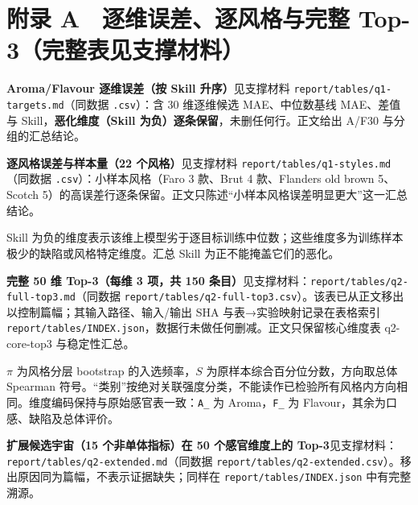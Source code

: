 \documentclass[11pt,a4paper]{article}
\begin{document}
\newpage
\appendix

\section*{附录 A　逐维误差、逐风格与完整
Top-3（完整表见支撑材料）}\label{ux9644ux5f55-a-ux9010ux7ef4ux8befux5deeux9010ux98ceux683cux4e0eux5b8cux6574-top-3ux5b8cux6574ux8868ux89c1ux652fux6491ux6750ux6599}

\textbf{Aroma/Flavour 逐维误差（按 Skill 升序）}见支撑材料
\texttt{report/\allowbreak{}tables/\allowbreak{}q1-\allowbreak{}targets.md}（同数据 \texttt{.csv}）：含 30
维逐维候选 MAE、中位数基线 MAE、差值与 Skill，\textbf{恶化维度（Skill
为负）逐条保留}，未删任何行。正文给出 A/F30 与分组的汇总结论。

\textbf{逐风格误差与样本量（22 个风格）}见支撑材料
\texttt{report/\allowbreak{}tables/\allowbreak{}q1-\allowbreak{}styles.md}（同数据
\texttt{.csv}）：小样本风格（Faro 3 款、Brut 4 款、Flanders old brown
5、Scotch
5）的高误差行逐条保留。正文只陈述``小样本风格误差明显更大''这一汇总结论。

Skill
为负的维度表示该维上模型劣于逐目标训练中位数；这些维度多为训练样本极少的缺陷或风格特定维度。汇总
Skill 为正不能掩盖它们的恶化。

\textbf{完整 50 维 Top-3（每维 3 项，共 150
条目）}见支撑材料：\texttt{report/\allowbreak{}tables/\allowbreak{}q2-\allowbreak{}full-\allowbreak{}top3.md}（同数据
\texttt{report/\allowbreak{}tables/\allowbreak{}q2-\allowbreak{}full-\allowbreak{}top3.csv}）。该表已从正文移出以控制篇幅；其输入路径、输入/输出
SHA 与表→实验映射记录在表格索引
\texttt{report/\allowbreak{}tables/\allowbreak{}INDEX.json}，数据行未做任何删减。正文只保留核心维度表
q2-core-top3 与稳定性汇总。

\(\pi\) 为风格分层 bootstrap 的入选频率，\(S\)
为原样本综合百分位分数，方向取总体 Spearman
符号。``类别''按绝对关联强度分类，不能读作已检验所有风格内方向相同。维度编码保持与原始感官表一致：\texttt{A\_}
为 Aroma，\texttt{F\_} 为 Flavour，其余为口感、缺陷及总体评价。

\textbf{扩展候选宇宙（15 个非单体指标）在 50 个感官维度上的
Top-3}见支撑材料：\texttt{report/\allowbreak{}tables/\allowbreak{}q2-\allowbreak{}extended.md}（同数据
\texttt{report/\allowbreak{}tables/\allowbreak{}q2-\allowbreak{}extended.csv}）。移出原因同为篇幅，不表示证据缺失；同样在
\texttt{report/\allowbreak{}tables/\allowbreak{}INDEX.json} 中有完整溯源。
\end{document}
